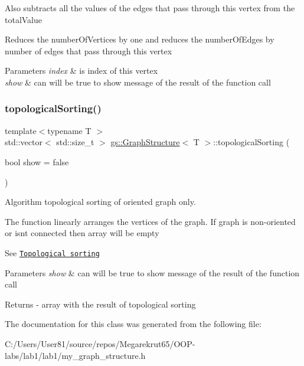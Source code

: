 Also subtracts all the values of the edges that pass through this vertex from the \textquotesingle{}total\+Value\textquotesingle{}

Reduces the \textquotesingle{}number\+Of\+Vertices\textquotesingle{} by one and reduces the \textquotesingle{}number\+Of\+Edges\textquotesingle{} by number of edges that pass through this vertex 
\begin{DoxyParams}{Parameters}
{\em index} & is index of this vertex \\
\hline
{\em show} & can will be true to show message of the result of the function call \\
\hline
\end{DoxyParams}
\mbox{\label{classgs_1_1_graph_structure_aaaccde89d753affe1ca96ad3a25a03b0}} 
\subsubsection{\texorpdfstring{topological\+Sorting()}{topologicalSorting()}}
{\footnotesize\ttfamily template$<$typename T $>$ \\
std\+::vector$<$ std\+::size\+\_\+t $>$ \mbox{\hyperlink{classgs_1_1_graph_structure}{gs\+::\+Graph\+Structure}}$<$ T $>$\+::topological\+Sorting (\begin{DoxyParamCaption}\item[{bool}]{show = {\ttfamily false} }\end{DoxyParamCaption})}



Algorithm topological sorting of oriented graph only. 

The function linearly arranges the vertices of the graph. If graph is non-\/oriented or isn\textquotesingle{}t connected then array will be empty

See \href{https://en.wikipedia.org/wiki/Topological_sorting}{\tt Topological sorting} 
\begin{DoxyParams}{Parameters}
{\em show} & can will be true to show message of the result of the function call \\
\hline
\end{DoxyParams}
\begin{DoxyReturn}{Returns}
-\/ array with the result of topological sorting 
\end{DoxyReturn}


The documentation for this class was generated from the following file\+:\begin{DoxyCompactItemize}
\item 
C\+:/\+Users/\+User81/source/repos/\+Megarekrut65/\+O\+O\+P-\/labs/lab1/lab1/my\+\_\+graph\+\_\+structure.\+h\end{DoxyCompactItemize}
